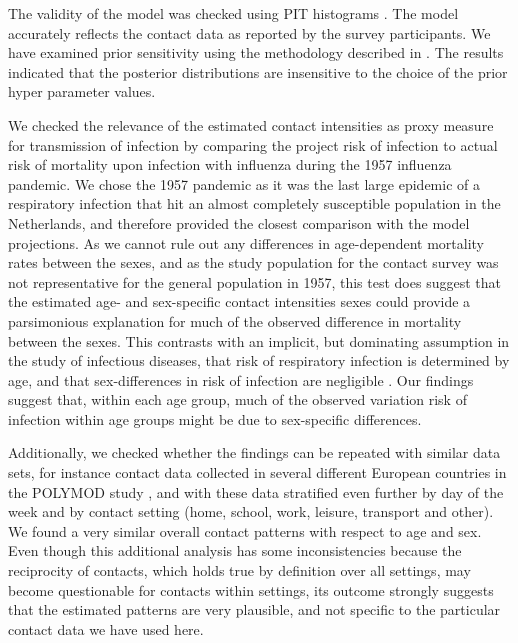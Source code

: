 \documentclass[aoas,preprint]{imsart}
\numberwithin{equation}{section}
\begin{document}
The validity of the model was checked using PIT histograms \citep{czado_predictive_2009}. The model accurately reflects the contact data as reported by the survey participants. We have examined prior sensitivity using the methodology described in \cite{roos_sensitivity_2015}. The results indicated that the posterior distributions are insensitive to the choice of the prior hyper parameter values.

We checked the relevance of the estimated contact intensities as proxy measure for transmission of infection by comparing the project risk of infection to actual risk of mortality upon infection with influenza during the 1957 influenza pandemic. We chose the 1957 pandemic as it was the last large epidemic of a respiratory infection that hit an almost completely susceptible population in the Netherlands, and therefore provided the closest comparison with the model projections. As we cannot rule out any differences in age-dependent mortality rates between the sexes, and as the study population for the contact survey was not representative for the general population in 1957, this test does suggest that the estimated age- and sex-specific contact intensities sexes could provide a parsimonious explanation for much of the observed difference in mortality between the sexes. This contrasts with an implicit, but dominating assumption in the study of infectious diseases, that risk of respiratory infection is determined by age, and that sex-differences in risk of infection are negligible \citep{klein_impact_2010}. Our findings suggest that, within each age group, much of the observed variation risk of infection within age groups might be due to sex-specific differences.

Additionally, we checked whether the findings can be repeated with similar data sets, for instance contact data collected in several different European countries in the POLYMOD study \citep{mossong_social_2008}, and with these data stratified even further by day of the week and by contact setting (home, school, work, leisure, transport and other). We found a very similar overall contact patterns with respect to age and sex. Even though this additional analysis has some inconsistencies because the reciprocity of contacts, which holds true by definition over all settings, may become questionable for contacts within settings, its outcome strongly suggests that the estimated patterns are very plausible, and not specific to the particular contact data we have used here.
\end{document}
